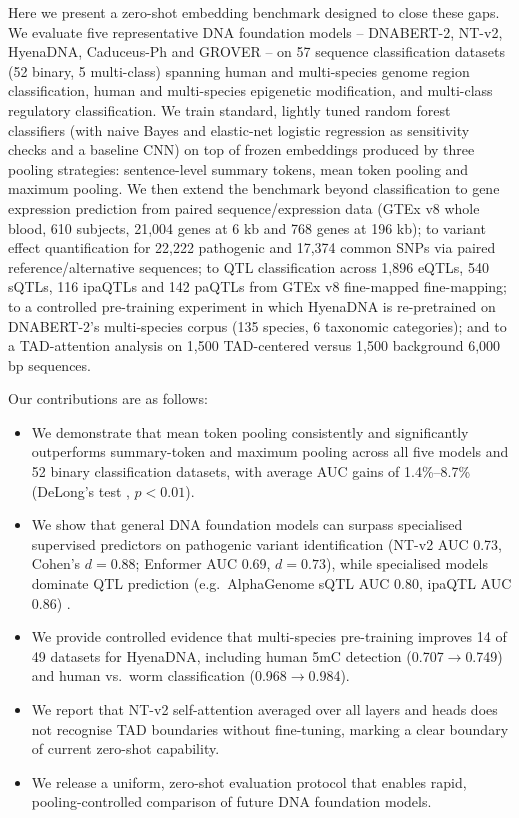 Here we present a zero-shot embedding benchmark designed to close these gaps. We evaluate five representative DNA foundation models -- DNABERT-2, NT-v2, HyenaDNA, Caduceus-Ph and GROVER -- on 57 sequence classification datasets (52 binary, 5 multi-class) spanning human and multi-species genome region classification, human and multi-species epigenetic modification, and multi-class regulatory classification. We train standard, lightly tuned random forest classifiers (with naive Bayes and elastic-net logistic regression as sensitivity checks and a baseline CNN) on top of frozen embeddings produced by three pooling strategies: sentence-level summary tokens, mean token pooling and maximum pooling. We then extend the benchmark beyond classification to gene expression prediction from paired sequence/expression data (GTEx v8 whole blood, 610 subjects, 21{,}004 genes at 6 kb and 768 genes at 196 kb); to variant effect quantification for 22{,}222 pathogenic and 17{,}374 common SNPs via paired reference/alternative sequences; to QTL classification across 1{,}896 eQTLs, 540 sQTLs, 116 ipaQTLs and 142 paQTLs from GTEx v8 fine-mapped fine-mapping; to a controlled pre-training experiment in which HyenaDNA is re-pretrained on DNABERT-2's multi-species corpus (135 species, 6 taxonomic categories); and to a TAD-attention analysis on 1{,}500 TAD-centered versus 1{,}500 background 6{,}000 bp sequences.

Our contributions are as follows:
\begin{itemize}
  \item We demonstrate that mean token pooling consistently and significantly outperforms summary-token and maximum pooling across all five models and 52 binary classification datasets, with average AUC gains of 1.4\%--8.7\% (DeLong's test \citep{delong1988comparing}, $p<0.01$).
  \item We show that general DNA foundation models can surpass specialised supervised predictors on pathogenic variant identification (NT-v2 AUC 0.73, Cohen's $d=0.88$; Enformer AUC 0.69, $d=0.73$), while specialised models dominate QTL prediction (e.g.\ AlphaGenome sQTL AUC 0.80, ipaQTL AUC 0.86) \citep{avsec2021enformer,chen2022sei,avsec2025alphagenome}.
  \item We provide controlled evidence that multi-species pre-training improves 14 of 49 datasets for HyenaDNA, including human 5mC detection (0.707$\to$0.749) and human vs.\ worm classification (0.968$\to$0.984).
  \item We report that NT-v2 self-attention averaged over all layers and heads does not recognise TAD boundaries without fine-tuning, marking a clear boundary of current zero-shot capability.
  \item We release a uniform, zero-shot evaluation protocol that enables rapid, pooling-controlled comparison of future DNA foundation models.
\end{itemize}

